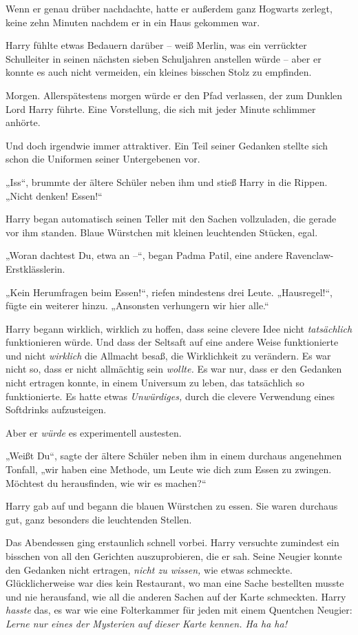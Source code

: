 {Wenn er genau drüber nachdachte, hatte er außerdem ganz Hogwarts zerlegt, keine zehn Minuten nachdem er in ein Haus gekommen war.

Harry fühlte etwas Bedauern darüber -- weiß Merlin, was ein verrückter Schulleiter in seinen nächsten sieben Schuljahren anstellen würde -- aber er konnte es auch nicht vermeiden, ein kleines bisschen Stolz zu empfinden.

Morgen. Allerspätestens morgen würde er den Pfad verlassen, der zum Dunklen Lord Harry führte. Eine Vorstellung, die sich mit jeder Minute schlimmer anhörte.

Und doch irgendwie immer attraktiver. Ein Teil seiner Gedanken stellte sich schon die Uniformen seiner Untergebenen vor.

„Iss“, brummte der ältere Schüler neben ihm und stieß Harry in die Rippen. „Nicht denken! Essen!“

Harry began automatisch seinen Teller mit den Sachen vollzuladen, die gerade vor ihm standen. Blaue Würstchen mit kleinen leuchtenden Stücken, egal.

„Woran dachtest Du, etwa an --“, began Padma Patil, eine andere Ravenclaw-Erstklässlerin.

„Kein Herumfragen beim Essen!“, riefen mindestens drei Leute. „Hausregel!“, fügte ein weiterer hinzu. „Ansonsten verhungern wir hier alle.“

Harry begann wirklich, wirklich zu hoffen, dass seine clevere Idee nicht \emph{tatsächlich} funktionieren würde. Und dass der Seltsaft auf eine andere Weise funktionierte und nicht \emph{wirklich} die Allmacht besaß, die Wirklichkeit zu verändern. Es war nicht so, dass er nicht allmächtig sein \emph{wollte.} Es war nur, dass er den Gedanken nicht ertragen konnte, in einem Universum zu leben, das tatsächlich so funktionierte. Es hatte etwas \emph{Unwürdiges,} durch die clevere Verwendung eines Softdrinks aufzusteigen.

Aber er \emph{würde} es experimentell austesten.

„Weißt Du“, sagte der ältere Schüler neben ihm in einem durchaus angenehmen Tonfall, „wir haben eine Methode, um Leute wie dich zum Essen zu zwingen. Möchtest du herausfinden, wie wir es machen?“

Harry gab auf und begann die blauen Würstchen zu essen. Sie waren durchaus gut, ganz besonders die leuchtenden Stellen.

Das Abendessen ging erstaunlich schnell vorbei. Harry versuchte zumindest ein bisschen von all den Gerichten auszuprobieren, die er sah. Seine Neugier konnte den Gedanken nicht ertragen, \emph{nicht zu wissen,} wie etwas schmeckte. Glücklicherweise war dies kein Restaurant, wo man eine Sache bestellten musste und nie herausfand, wie all die anderen Sachen auf der Karte schmeckten. Harry \emph{hasste} das, es war wie eine Folterkammer für jeden mit einem Quentchen Neugier: \emph{Lerne nur eines der Mysterien auf dieser Karte kennen. Ha ha ha!}

}
